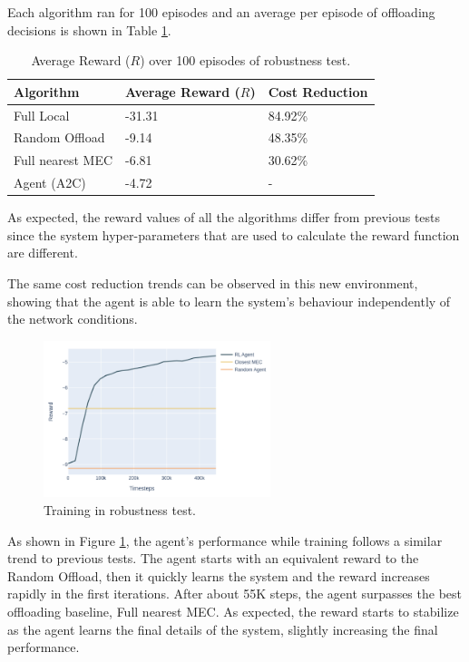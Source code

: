 Each algorithm ran for 100 episodes and an average per episode of offloading decisions is shown in Table \ref{robust_table}.

\begin{table}[H]
\centering
\begin{tabular}{|l|l|l|}
\hline
Algorithm        & Average Reward ($R$) & Cost Reduction\\ \hline
Full Local       & -31.31 & 84.92\%\\
Random Offload   & -9.14 & 48.35\%\\
Full nearest MEC & -6.81 & 30.62\%\\ 
Agent (A2C) & -4.72 & -\\ \hline
\end{tabular}
\caption{Average Reward ($R$) over 100 episodes of robustness test.} \label{robust_table}
\end{table}

As expected, the reward values of all the algorithms differ from previous tests since the system hyper-parameters that are used to calculate the reward function are different.

The same cost reduction trends can be observed in this new environment, showing that the agent is able to learn the system's behaviour independently of the network conditions.

\begin{figure}[H]
  \centering
  \includegraphics[width=250px]{images/5_10_training_new.png}
  \caption{Training in robustness test.}  \label{robust_training}
\end{figure}

As shown in Figure \ref{robust_training}, the agent's performance while training follows a similar trend to previous tests. The agent starts with an equivalent reward to the Random Offload, then it quickly learns the system and the reward increases rapidly in the first iterations. After about 55K steps, the agent surpasses the best offloading baseline, Full nearest MEC. As expected, the reward starts to stabilize as the agent learns the final details of the system, slightly increasing the final performance.

